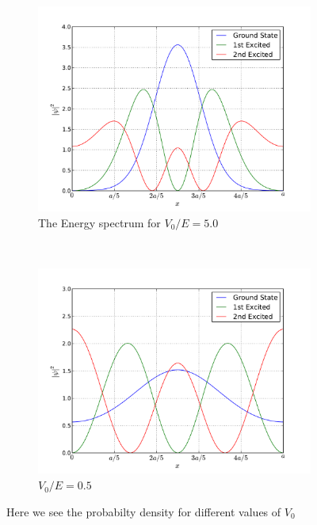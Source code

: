 \documentclass[11pt,a4paper]{article}
\begin{document}
\begin{figure}[hb!]
        \centering
        \begin{subfigure}[h!]{0.5\textwidth}
                \includegraphics[width=\textwidth]{prob_density/first3states5tV.pdf}
                \caption{The Energy spectrum for $V_0/E = 5.0$}
                \label{fig:h4a}
        \end{subfigure}%
        ~ %
        \begin{subfigure}[hb!]{0.5\textwidth}
                \includegraphics[width=\textwidth]{prob_density/first3statesVd2.pdf}
                \caption{$V_0/E = 0.5$}
                \label{fig:h4b}
        \end{subfigure}
\caption{Here we see the probabilty density for different values of $V_0$ }\label{fig:psi2}
\end{figure}
\end{document}
